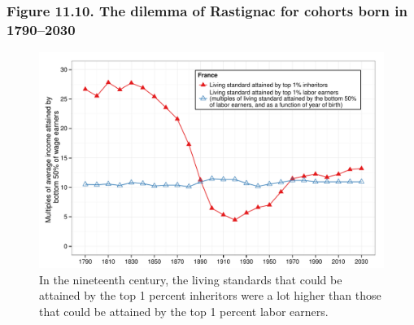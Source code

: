 \documentclass[t]{beamer}\usepackage[]{graphicx}\usepackage[]{color}
\newenvironment{knitrout}{}{} %
\begin{document}
\begin{frame}[label=Figure_11_10]
\frametitle{Figure 11.10. The dilemma of Rastignac for cohorts born in 1790--2030}
\begin{figure}[t]
\begin{minipage}[b]{\textwidth}
\centering
\begin{knitrout}\footnotesize
{}\color{fgcolor}

{\centering \includegraphics[width=1\linewidth]{figures/color/Figure_11_10} 

}



\end{knitrout}
\caption{In the nineteenth century, the living standards that could be attained by the top 1 percent inheritors were a lot higher than those that could be attained by the top 1 percent labor earners.}
\end{minipage}
\end{figure}
\end{frame}
\end{document}
